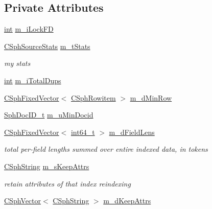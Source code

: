 \subsection*{Private Attributes}
\begin{DoxyCompactItemize}
\item 
\hyperlink{sphinxexpr_8cpp_a4a26e8f9cb8b736e0c4cbf4d16de985e}{int} \hyperlink{classCSphIndex__VLN_a52726c9aa707f16daf6c2ac9121dba4c}{m\-\_\-i\-Lock\-F\-D}
\item 
\hyperlink{structCSphSourceStats}{C\-Sph\-Source\-Stats} \hyperlink{classCSphIndex__VLN_a44fa11618a881933be296b1faf9953d3}{m\-\_\-t\-Stats}
\begin{DoxyCompactList}\small\item\em my stats \end{DoxyCompactList}\item 
\hyperlink{sphinxexpr_8cpp_a4a26e8f9cb8b736e0c4cbf4d16de985e}{int} \hyperlink{classCSphIndex__VLN_ad1a73d5715b4677c8b1aa90864511d57}{m\-\_\-i\-Total\-Dups}
\item 
\hyperlink{classCSphFixedVector}{C\-Sph\-Fixed\-Vector}$<$ \hyperlink{sphinx_8h_a6a2df0f05f3397df8b6e230fda6f852f}{C\-Sph\-Rowitem} $>$ \hyperlink{classCSphIndex__VLN_add0678514a5453c688e54b9ddeda6902}{m\-\_\-d\-Min\-Row}
\item 
\hyperlink{sphinx_8h_a3176771631c12a9e4897272003e6b447}{Sph\-Doc\-I\-D\-\_\-t} \hyperlink{classCSphIndex__VLN_a35b0482c8ed0e2722d10435b7c27d73c}{m\-\_\-u\-Min\-Docid}
\item 
\hyperlink{classCSphFixedVector}{C\-Sph\-Fixed\-Vector}$<$ \hyperlink{sphinxstd_8h_a996e72f71b11a5bb8b3b7b6936b1516d}{int64\-\_\-t} $>$ \hyperlink{classCSphIndex__VLN_a276716802f2e004b84c4325cfa5f6af6}{m\-\_\-d\-Field\-Lens}
\begin{DoxyCompactList}\small\item\em total per-\/field lengths summed over entire indexed data, in tokens \end{DoxyCompactList}\item 
\hyperlink{structCSphString}{C\-Sph\-String} \hyperlink{classCSphIndex__VLN_aeb67c1c2b19b152ad3d5f965b49dd919}{m\-\_\-s\-Keep\-Attrs}
\begin{DoxyCompactList}\small\item\em retain attributes of that index reindexing \end{DoxyCompactList}\item 
\hyperlink{classCSphVector}{C\-Sph\-Vector}$<$ \hyperlink{structCSphString}{C\-Sph\-String} $>$ \hyperlink{classCSphIndex__VLN_ae0b5a4d5a90aaf8db1eb7c73824abb7b}{m\-\_\-d\-Keep\-Attrs}

\end{DoxyCompactItemize}
